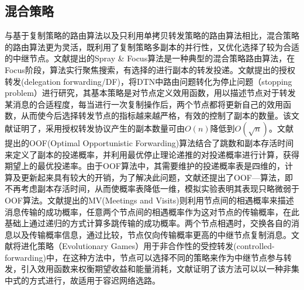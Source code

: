\subsection{混合策略}

与基于复制策略的路由算法以及只利用单拷贝转发策略的路由算法相比，混合策略的路由算法更为灵活，既利用了复制策略多副本的并行性，又优化选择了较为合适的中继节点。文献提出的Spray \& Focus算法是一种典型的混合策略路由算法，在Focus阶段，算法实行聚焦搜索，有选择的进行副本的转发投递。文献提出的授权转发(delegation forwarding/DF)，将DTN中路由问题转化为停止问题（stopping problem）进行研究，其基本策略是对节点定义效用函数，用以描述节点对于转发某消息的合适程度，每当进行一次复制操作后，两个节点都将更新自己的效用函数，从而使今后选择转发节点的指标越来越严格，有效的控制了副本的数量。该文献证明了，采用授权转发协议产生的副本数量可由$O(n)$降低到$O(\sqrt{n})$。文献提出的OOF(Optimal Opportunistic Forwarding)算法结合了跳数和副本存活时间来定义了副本的投递概率，并利用最优停止理论递推的对投递概率进行计算，获得期望上的最优投递率。由于OOF算法中，其需要维护的投递概率表是四维的，计算及更新起来具有较大的开销，为了解决此问题，文献还提出了OOF—算法，即不再考虑副本存活时间，从而使概率表降低一维，模拟实验表明其表现只略微弱于OOF算法。文献提出的MV(Meetings and Visits)则利用节点间的相遇概率来描述消息传输的成功概率，任意两个节点间的相遇概率作为这对节点的传输概率，在此基础上通过递归的方式计算多跳传输的成功概率。两个节点相遇时，交换各自的消息以及传输概率信息，通过比较，节点仅向传输概率更高的中继节点复制消息。文献将进化策略（Evolutionary Games）用于非合作性的受控转发(controlled-forwarding)中，在这种方法中，节点可以选择不同的策略来作为中继节点参与转发，引入效用函数来权衡期望收益和能量消耗，文献证明了该方法可以以一种非集中式的方式进行，故适用于容迟网络选路。


